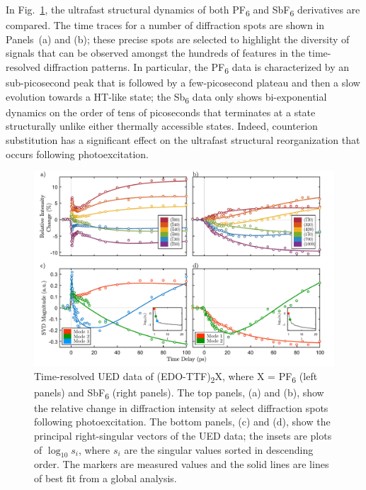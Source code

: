 In Fig.~\ref{fig: EDOSb-UEDtraces}, the ultrafast structural dynamics
of both PF\textsubscript{6} and SbF\textsubscript{6} derivatives are compared.
%
The time traces for a number of diffraction spots are shown in Panels~(a) and (b);
these precise spots are selected to highlight the diversity of signals that can be
observed amongst the hundreds of features in the time-resolved diffraction patterns.
%
In particular, the PF\textsubscript{6} data is characterized by an sub-picosecond peak
that is followed by a few-picosecond plateau and then a slow evolution towards a HT-like state;
the Sb\textsubscript{6} data only shows bi-exponential dynamics on the order of tens of picoseconds
that terminates at a state structurally unlike either thermally accessible states.
%
Indeed, counterion substitution has a significant effect on the ultrafast structural reorganization
that occurs following photoexcitation.
%
\begin{figure}[ht!]
  \centering
  \includegraphics[width = \textwidth]{Figures/fig_EDOSb_UEDtraces.pdf}
  \caption[Time-resolved UED data of (EDO-TTF)\textsubscript{2}X
    (X = PF\textsubscript{6}, SbF\textsubscript{6}).]{
    Time-resolved UED data of (EDO-TTF)\textsubscript{2}X,
    where X = PF\textsubscript{6} (left panels) and SbF\textsubscript{6} (right panels).
    The top panels, (a) and (b), show the relative change in diffraction intensity
    at select diffraction spots following photoexcitation.
    The bottom panels, (c) and (d), show the principal right-singular vectors
    of the UED data; the insets are plots of $\log_{10} s_i$, where $s_i$ are the singular values
    sorted in descending order.
    The markers are measured values and the solid lines are lines of best fit
    from a global analysis.
  }
  \label{fig: EDOSb-UEDtraces}
\end{figure}

